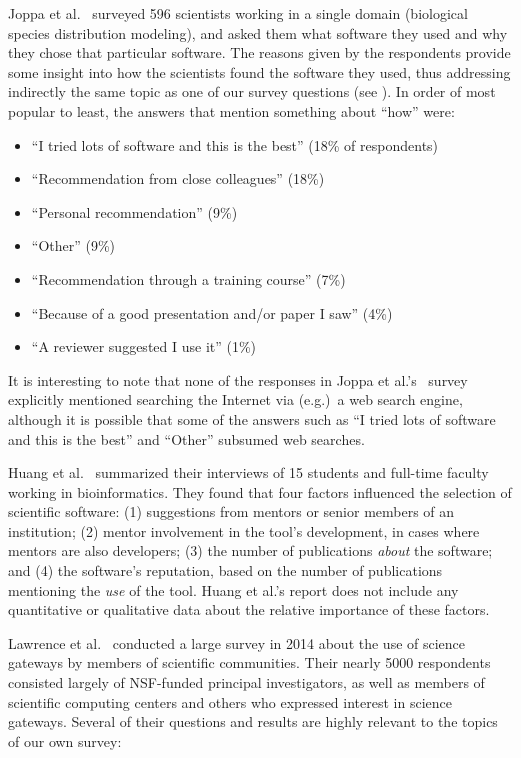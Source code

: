 \documentclass{casicswhitepaper}
\begin{document}
Joppa et al.~\cite{joppa2013troubling} surveyed 596 scientists working in a single domain (biological species distribution modeling), and asked them what software they used and why they chose that particular software.  The reasons given by the respondents provide some insight into how the scientists found the software they used, thus addressing indirectly the same topic as one of our survey questions (see ).  In order of most popular to least, the answers that mention something about ``how'' were:
\begin{itemize}[itemsep=-0.5ex]

\item ``I tried lots of software and this is the best'' (18\% of respondents)
\item ``Recommendation from close colleagues'' (18\%)
\item ``Personal recommendation'' (9\%)
\item ``Other'' (9\%)
\item ``Recommendation through a training course'' (7\%)
\item ``Because of a good presentation and/or paper I saw'' (4\%)
\item ``A reviewer suggested I use it'' (1\%)

\end{itemize}

It is interesting to note that none of the responses in Joppa et al.'s~\cite{joppa2013troubling} survey explicitly mentioned searching the Internet via (e.g.)\ a web search engine, although it is possible that some of the answers such as ``I tried lots of software and this is the best'' and ``Other'' subsumed web searches.

Huang et al.~\cite{huang2013provenance} summarized their interviews of 15 students and full-time faculty working in bioinformatics.  They found that four factors influenced the selection of scientific software: (1) suggestions from mentors or senior members of an institution; (2) mentor involvement in the tool's development, in cases where mentors are also developers; (3) the number of publications \emph{about} the software; and (4) the software's reputation, based on the number of publications mentioning the \emph{use} of the tool.  Huang et al.'s report does not include any quantitative or qualitative data about the relative importance of these factors.

Lawrence et al.~\cite{lawrence2015science, lawrence2014who} conducted a large survey in 2014 about the use of science gateways by members of scientific communities.  Their nearly 5000 respondents consisted largely of NSF-funded principal investigators, as well as members of scientific computing centers and others who expressed interest in science gateways.  Several of their questions and results are highly relevant to the topics of our own survey:
\end{document}
